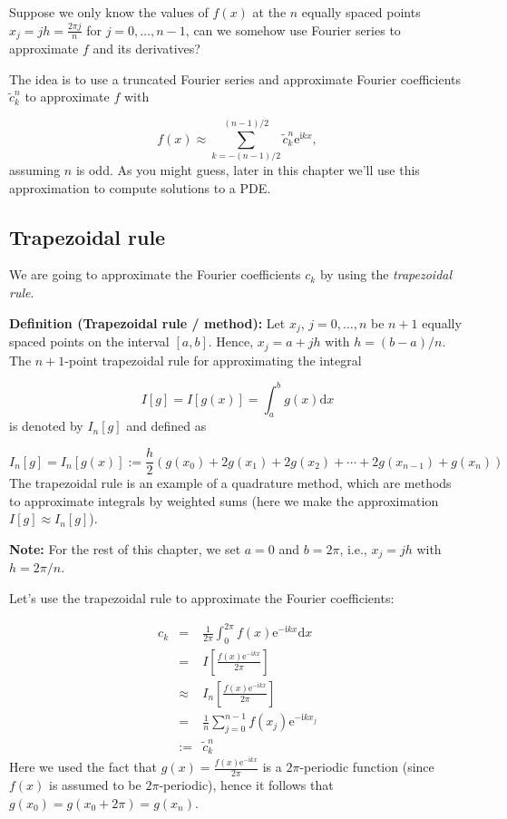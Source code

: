 \documentclass[12pt,a4paper]{article}
\begin{document}
Suppose we only know the values of $f(x)$ at the $n$ equally spaced points $x_{j} = jh = \frac{2\pi j}{n}$ for $j = 0, \ldots, n-1$, can we somehow use Fourier series to approximate $f$ and its derivatives?

The idea is to use a truncated Fourier series and approximate Fourier coefficients $\tilde{c}^n_k$ to approximate $f$ with

\[
f(x) \approx \sum_{k=-(n-1)/2}^{(n-1)/2} \tilde{c}^n_k \mathrm{e}^{\mathrm{i} k x},
\]
assuming $n$ is odd.  As you might guess, later in this chapter we'll use this approximation to compute solutions to a PDE.

\subsection{Trapezoidal rule}
We are going to approximate the Fourier coefficients $c_k$ by using the \emph{trapezoidal rule}.

\textbf{Definition (Trapezoidal rule / method):} Let $x_{j}$, $j = 0, \ldots, n$ be $n+1$ equally spaced points on the interval $[a, b]$. Hence, $x_j = a + jh$ with $h = (b-a)/n$. The $n+1$-point trapezoidal rule for approximating the integral 

\[
I[g] = I[g(x)] = \int_{a}^{b} g(x) \mathrm{d} x 
\]
is denoted by $I_n[g]$ and defined as

\[
I_n[g] = I_n[g(x)] := \frac{h}{2}\left(g(x_0) + 2g(x_1) + 2g(x_2) + \cdots + 2g(x_{n-1}) + g(x_{n})    \right)
\]
The trapezoidal rule is an example of a quadrature method, which are methods to approximate integrals by weighted sums (here we make the approximation $I[g] \approx I_n[g]$).

\textbf{Note:} For the rest of this chapter, we set $a = 0$ and $b  = 2\pi$, i.e., $x_j = jh$ with $h = 2\pi/n$.

Let's use the trapezoidal rule to approximate the Fourier coefficients: 


\begin{eqnarray*}
c_k &=& \frac{1}{2\pi}\int_{0}^{2\pi} f(x) \mathrm{e}^{-\mathrm{i}k x} \mathrm{d} x \\
    &=& I\left[\frac{f(x) \mathrm{e}^{-\mathrm{i}k x}}{2\pi}   \right] \\
    &\approx & I_{n}\left[\frac{f(x)\mathrm{e}^{-\mathrm{i}k x}}{2\pi}\right]  \\
    &=& \frac{1}{n}\sum_{j = 0}^{n-1} f(x_j)\mathrm{e}^{-\mathrm{i}kx_j} \\
    &:=& \tilde{c}^n_k
\end{eqnarray*}
Here we used the fact that $g(x) = \frac{f(x)\mathrm{e}^{-\mathrm{i}k x}}{2\pi}$ is a $2\pi$-periodic function (since $f(x)$ is assumed to be $2\pi$-periodic), hence it follows that $g(x_0) = g(x_0 + 2\pi) = g(x_n)$.
\end{document}
